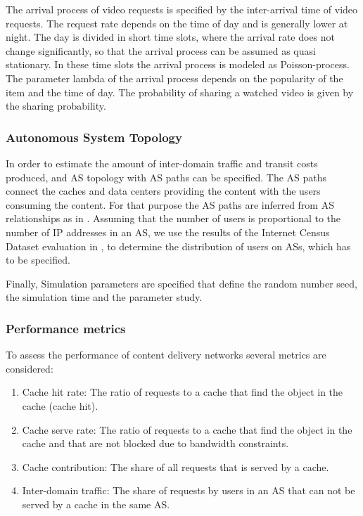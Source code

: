 The arrival process of video requests is specified by the inter-arrival time of video requests.
The request rate depends on the time of day and is generally lower at night.
The day is divided in short time slots, where the arrival rate does not change significantly, so that the arrival process can be assumed as quasi stationary.
In these time slots the arrival process is modeled as Poisson-process.
The parameter lambda of the arrival process depends on the popularity of the item and the time of day.
The probability of sharing a watched video is given by the sharing probability.

\subsubsection{Autonomous System Topology}
In order to estimate the amount of inter-domain traffic and transit costs produced, and AS topology with AS paths can be specified.
The AS paths connect the caches and data centers providing the content with the users consuming the content.
For that purpose the AS paths are inferred from AS relationships as in .
Assuming that the number of users is proportional to the number of IP addresses in an AS, we use the results of the Internet Census Dataset evaluation in , to determine the distribution of users on ASs, which has to be specified.

Finally, Simulation parameters are specified that define the random number seed, the simulation time and the parameter study.

\subsubsection{Performance metrics}

To assess the performance of content delivery networks several metrics are considered:

\begin{enumerate}
\item Cache hit rate: The ratio of requests to a cache that find the object in the cache (cache hit).
\item Cache serve rate: The ratio of requests to a cache that find the object in the cache and that are not blocked due to bandwidth constraints.
\item Cache contribution: The share of all requests that is served by a cache.
\item Inter-domain traffic: The share of requests by users in an AS that can not be served by a cache in the same AS.
\end{enumerate}

